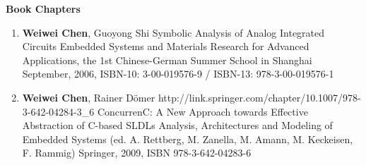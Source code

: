 \vspace{5mm}
{\textbf{\large Book Chapters}}
\vspace{-2mm}
\begin{enumerate}

\item 
	\mypub
	{\textbf{Weiwei Chen}, Guoyong Shi}
	{Symbolic Analysis of Analog Integrated Circuits}
	{}
	{Embedded Systems and Materials Research for Advanced Applications, the 1st Chinese-German Summer School in Shanghai}
	{September, 2006, ISBN-10: 3-00-019576-9 / ISBN-13: 978-3-00-019576-1}

\item 
	\mypubhl
	{\textbf{Weiwei Chen}, Rainer D\"{o}mer}
	{http://link.springer.com/chapter/10.1007/978-3-642-04284-3_6}
	{ConcurrenC: A New Approach towards Effective Abstraction of C-based SLDLs}
	{}
	{Analysis, Architectures and Modeling of Embedded Systems (ed. A. Rettberg, M. Zanella, M. Amann, M. Keckeisen, F. Rammig)}
	{Springer, 2009, ISBN 978-3-642-04283-6}

\end{enumerate}

